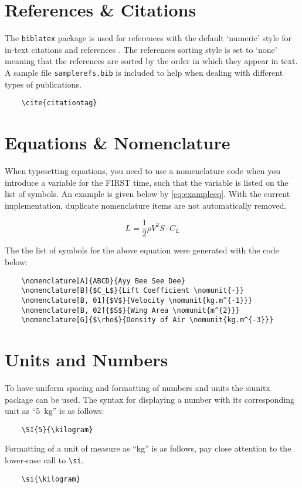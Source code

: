 \section{References \& Citations}
The \texttt{biblatex} package is used for references with the default `numeric'
style for in-text citations and references \cite{sampleref}. The references
sorting style is set to `none' meaning that the references are sorted by the
order in which they appear in text. A sample file \texttt{samplerefs.bib} is
included to help when dealing with different types of publications.

\begin{verbatim}
    \cite{citationtag}
\end{verbatim}


\section{Equations \& Nomenclature}
When typesetting equations, you need to use a nomenclature code when you
introduce a variable for the FIRST time, such that the variable is listed on
the list of symbols. An example is given below by \cref{eq:exampleeq}. With the
current implementation, duplicate nomenclature items are not automatically
removed.

\begin{equation}
\label{eq:exampleeq}
    L = \frac{1}{2}\rho V^2 S \cdot C_{L}
\end{equation}


The the list of symbols for the above equation were generated with the code
below:

\begin{verbatim}
    \nomenclature[A]{ABCD}{Ayy Bee See Dee}
    \nomenclature[B]{$C_L$}{Lift Coefficient \nomunit{-}}
    \nomenclature[B, 01]{$V$}{Velocity \nomunit{kg.m^{-1}}}
    \nomenclature[B, 02]{$S$}{Wing Area \nomunit{m^{2}}}
    \nomenclature[G]{$\rho$}{Density of Air \nomunit{kg.m^{-3}}}
\end{verbatim}


\section{Units and Numbers}
To have uniform spacing and formatting of numbers and units the
\textsf{siunitx} package can be used. The syntax for displaying a number
with its corresponding unit as ``\SI{5}{\kilogram}'' is as follows:

\begin{verbatim}
    \SI{5}{\kilogram}
\end{verbatim}

Formatting of a unit of measure as ``\si{\kilogram}'' is as follows, pay
close attention to the lower-case call to \texttt{\textbackslash si}.

\begin{verbatim}
    \si{\kilogram}
\end{verbatim}

